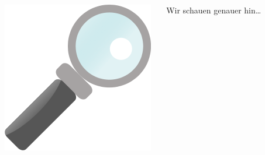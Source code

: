 \documentclass{beamer}
\begin{document}
\begin{frame}
\begin{columns}[T]
\begin{column}{0.25\textwidth}
{      }
    \end{column}
    \begin{column}{0.75\textwidth}
      \vskip1cm
      \begin{columns}
        \begin{column}{0.1\textwidth}
        \end{column}
        \begin{column}{0.2\textwidth}
          \centering
          \includegraphics[width=\textwidth]{matter/Lupe.png}
        \end{column}
        \begin{column}{0.7\textwidth}
          \alert{Wir schauen genauer hin\ldots}
        \end{column}
      \end{columns}
      \vskip0.5cm
      \begin{columns}
        \begin{column}{0.1\textwidth}
        \end{column}
        \begin{column}{0.8\textwidth}
\end{column}
\end{columns}
\end{column}
\end{columns}
\end{frame}
\end{document}
